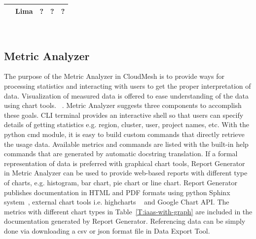 \documentclass{tex/sig-alternate}
\begin{document}
{\begin{table}[h!]
\begin{small}
\begin{tabularx}{\columnwidth}{|l|X|X|X|}
    ~~Lima     & ?       &  ?      &  ?       \\   
    \hline
  \end{tabularx}\\
\end{small}
\end{table}

\subsection{Metric Analyzer}

The purpose of the Metric Analyzer in CloudMesh is to provide ways for processing statistics and interacting with users to get the proper interpretation of data. Visualization of measured data is offered to ease understanding of the data using chart tools. ~\cite{kosslyn1989understanding,pinker1990theory,friel2001making}. Metric Analyzer suggests three components to accomplish these goals. CLI terminal provides an interactive shell so that users can specify details of getting statistics e.g. region, cluster, user, project names, etc. With the python cmd module, it is easy to build custom commands that directly retrieve the usage data. Available metrics and commands are listed with the built-in help commands that are generated by automatic docstring translation. If a formal representation of data is preferred with graphical chart tools, Report Generator in Metric Analyzer can be used to provide web-based reports with different type of charts, e.g. histogram, bar chart, pie chart or line chart. Report Generator publishes documentation in HTML and PDF formats using python Sphinx system~\cite{brandl2009sphinx}, external chart tools i.e. highcharts ~\cite{highsoft2012highcharts} and Google Chart API. The metrics with different chart types in Table~\ref{T:iaas-with-graph} are included in the documentation generated by Report Generator. Referencing data can be simply done via downloading a csv or json format file in Data Export Tool.

}
\end{document}
